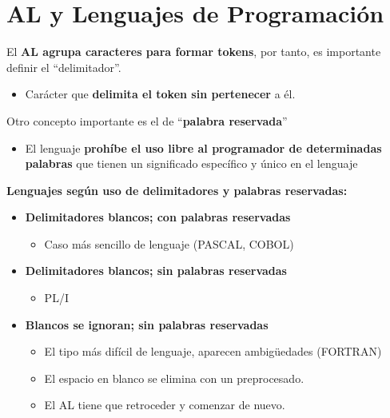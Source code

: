 \documentclass[12pt]{report} %
\begin{document}
\section{AL y Lenguajes de Programación}

El \textbf{AL agrupa caracteres para formar tokens}, por tanto, es
importante definir el ``delimitador''.

\begin{itemize}

\item
  Carácter que \textbf{delimita el token sin pertenecer} a él.
\end{itemize}

Otro concepto importante es el de ``\textbf{palabra reservada}''

\begin{itemize}

\item
  El lenguaje \textbf{prohíbe el uso libre al programador de
  determinadas palabras} que tienen un significado específico y único en
  el lenguaje
\end{itemize}

\textbf{Lenguajes según uso de delimitadores y palabras reservadas:}

\begin{itemize}

\item
  \textbf{Delimitadores blancos; con palabras reservadas}

  \begin{itemize}
  
  \item
    Caso más sencillo de lenguaje (PASCAL, COBOL)
  \end{itemize}
\item
  \textbf{Delimitadores blancos; sin palabras reservadas}

  \begin{itemize}
  
  \item
    PL/I
  \end{itemize}
\item
  \textbf{Blancos se ignoran; sin palabras reservadas}

  \begin{itemize}
  
  \item
    El tipo más difícil de lenguaje, aparecen ambigüedades (FORTRAN)
  \item
    El espacio en blanco se elimina con un preprocesado.
  \item
    El AL tiene que retroceder y comenzar de nuevo.
  \end{itemize}
\end{itemize}
\end{document}
